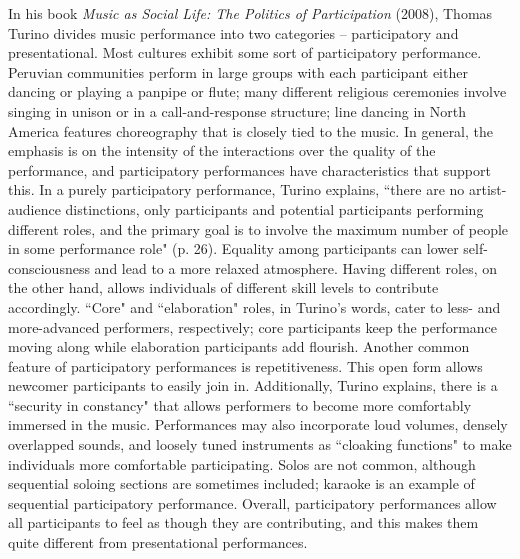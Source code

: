 In his book \textit{Music as Social Life: The Politics of Participation} (2008), Thomas Turino divides music performance into two categories -- participatory and presentational. Most cultures exhibit some sort of participatory performance. Peruvian communities perform in large groups with each participant either dancing or playing a panpipe or flute; many different religious ceremonies involve singing in unison or in a call-and-response structure; line dancing in North America features choreography that is closely tied to the music. In general, the emphasis is on the intensity of the interactions over the quality of the performance, and participatory performances have characteristics that support this. In a purely participatory performance, Turino explains, ``there are no artist-audience distinctions, only participants and potential participants performing different roles, and the primary goal is to involve the maximum number of people in some performance role" (p. 26). Equality among participants can lower self-consciousness and lead to a more relaxed atmosphere. Having different roles, on the other hand, allows individuals of different skill levels to contribute accordingly. ``Core" and ``elaboration" roles, in Turino's words, cater to less- and more-advanced performers, respectively; core participants keep the performance moving along while elaboration participants add flourish. Another common feature of participatory performances is repetitiveness. This open form allows newcomer participants to easily join in. Additionally, Turino explains, there is a ``security in constancy" that allows performers to become more comfortably immersed in the music. Performances may also incorporate loud volumes, densely overlapped sounds, and loosely tuned instruments as ``cloaking functions" to make individuals more comfortable participating. Solos are not common, although sequential soloing sections are sometimes included; karaoke is an example of sequential participatory performance. Overall, participatory performances allow all participants to feel as though they are contributing, and this makes them quite different from presentational performances.
